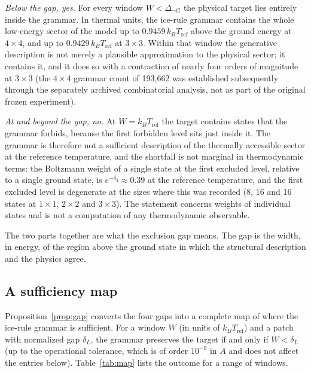 \documentclass[11pt,a4paper]{article}
\theoremstyle{plain}
\theoremstyle{definition}
\theoremstyle{remark}
\newcommand{\dnG}{\Delta_{\neg G}}
\newcommand{\kBT}{k_{B}T}
\begin{document}
\emph{Below the gap, yes.} For every window $W<\dnG$ the physical target lies entirely inside the grammar. In thermal units, the ice-rule grammar contains the whole low-energy sector of the model up to $0.9459\,\kBT_{\mathrm{ref}}$ above the ground energy at $4\times4$, and up to $0.9429\,\kBT_{\mathrm{ref}}$ at $3\times3$. Within that window the generative description is not merely a plausible approximation to the physical sector; it contains it, and it does so with a contraction of nearly four orders of magnitude at $3\times3$ (the $4\times4$ grammar count of 193{,}662 was established subsequently through the separately archived combinatorial analysis, not as part of the original frozen experiment).

\emph{At and beyond the gap, no.} At $W=\kBT_{\mathrm{ref}}$ the target contains states that the grammar forbids, because the first forbidden level sits just inside it. The grammar is therefore not a sufficient description of the thermally accessible sector at the reference temperature, and the shortfall is not marginal in thermodynamic terms: the Boltzmann weight of a single state at the first excluded level, relative to a single ground state, is $e^{-\delta_4}\approx0.39$ at the reference temperature, and the first excluded level is degenerate at the sizes where this was recorded (8, 16 and 16 states at $1\times1$, $2\times2$ and $3\times3$). The statement concerns weights of individual states and is not a computation of any thermodynamic observable.

The two parts together are what the exclusion gap means. The gap is the width, in energy, of the region above the ground state in which the structural description and the physics agree.

\subsection{A sufficiency map}
Proposition~\ref{prop:gap} converts the four gaps into a complete map of where the ice-rule grammar is sufficient. For a window $W$ (in units of $\kBT_{\mathrm{ref}}$) and a patch with normalized gap $\delta_L$, the grammar preserves the target if and only if $W<\delta_L$ (up to the operational tolerance, which is of order $10^{-9}$ in $A$ and does not affect the entries below). Table~\ref{tab:map} lists the outcome for a range of windows.
\end{document}
